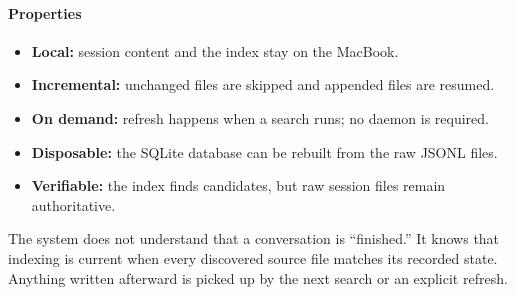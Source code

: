 \paragraph{Properties}
\begin{itemize}
    \item \textbf{Local:} session content and the index stay on the MacBook.
    \item \textbf{Incremental:} unchanged files are skipped and appended files are resumed.
    \item \textbf{On demand:} refresh happens when a search runs; no daemon is required.
    \item \textbf{Disposable:} the SQLite database can be rebuilt from the raw JSONL files.
    \item \textbf{Verifiable:} the index finds candidates, but raw session files remain authoritative.
\end{itemize}

The system does not understand that a conversation is ``finished.''
It knows that indexing is current when every discovered source file matches its recorded state.
Anything written afterward is picked up by the next search or an explicit  refresh.


